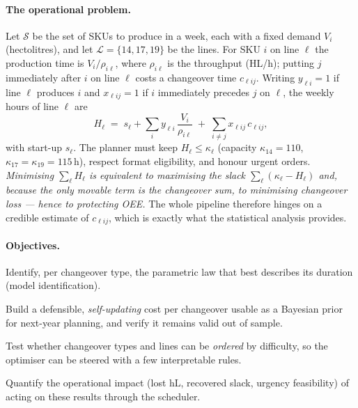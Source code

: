 \documentclass[11pt,a4paper]{article}
\begin{document}
\paragraph{The operational problem.}
Let $\mathcal{S}$ be the set of SKUs to produce in a week, each with a fixed
demand $V_i$ (hectolitres), and let $\mathcal{L}=\{14,17,19\}$ be the lines. For
SKU $i$ on line $\ell$ the production time is $V_i/\rho_{i\ell}$, where
$\rho_{i\ell}$ is the throughput (HL/h); putting $j$ immediately after $i$ on
line $\ell$ costs a changeover time $c_{\ell ij}$. Writing $y_{\ell i}=1$ if line
$\ell$ produces $i$ and $x_{\ell ij}=1$ if $i$ immediately precedes $j$ on
$\ell$, the weekly hours of line $\ell$ are
\begin{equation}
H_\ell \;=\; s_\ell + \sum_{i} y_{\ell i}\,\frac{V_i}{\rho_{i\ell}}
            \;+\; \sum_{i\neq j} x_{\ell ij}\,c_{\ell ij},
\label{eq:hours}
\end{equation}
with start-up $s_\ell$. The planner must keep $H_\ell\le \kappa_\ell$ (capacity
$\kappa_{14}=110$, $\kappa_{17}=\kappa_{19}=115$\,h), respect format eligibility,
and honour urgent orders. \emph{Minimising $\sum_\ell H_\ell$ is equivalent to
maximising the slack $\sum_\ell(\kappa_\ell-H_\ell)$ and, because the only
movable term is the changeover sum, to minimising changeover loss --- hence to
protecting OEE.} The whole pipeline therefore hinges on a credible estimate of
$c_{\ell ij}$, which is exactly what the statistical analysis provides.

\paragraph{Objectives.}
\begin{description}[leftmargin=2.2em,itemsep=1pt]
\item[O1] Identify, per changeover type, the parametric law that best describes
its duration (model identification).
\item[O2] Build a defensible, \emph{self-updating} cost per changeover usable as a
Bayesian prior for next-year planning, and verify it remains valid out of sample.
\item[O3] Test whether changeover types and lines can be \emph{ordered} by
difficulty, so the optimiser can be steered with a few interpretable rules.
\item[O4] Quantify the operational impact (lost hL, recovered slack, urgency
feasibility) of acting on these results through the scheduler.
\end{description}
\end{document}
